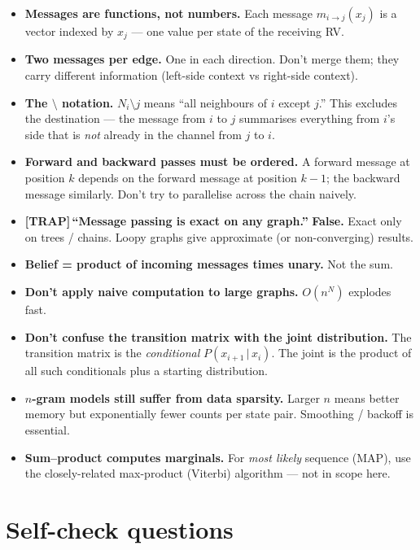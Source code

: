 \documentclass[11pt, a4paper]{article}
\newcommand{\trapflag}{\textcolor{trapBd}{\textbf{[TRAP]}}\,}
\begin{document}
\begin{itemize}
  \item \textbf{Messages are functions, not numbers.} Each message $m_{i\to j}(x_j)$ is a vector indexed by $x_j$ — one value per state of the receiving RV.
  \item \textbf{Two messages per edge.} One in each direction. Don't merge them; they carry different information (left-side context vs right-side context).
  \item \textbf{The $\setminus$ notation.} $N_i \setminus j$ means ``all neighbours of $i$ except $j$.'' This excludes the destination — the message from $i$ to $j$ summarises everything from $i$'s side that is \emph{not} already in the channel from $j$ to $i$.
  \item \textbf{Forward and backward passes must be ordered.} A forward message at position $k$ depends on the forward message at position $k-1$; the backward message similarly. Don't try to parallelise across the chain naively.
  \item \trapflag{}\textbf{``Message passing is exact on any graph.''} \textbf{False.} Exact only on trees / chains. Loopy graphs give approximate (or non-converging) results.
  \item \textbf{Belief = product of incoming messages times unary.} Not the sum.
  \item \textbf{Don't apply naive computation to large graphs.} $O(n^N)$ explodes fast.
  \item \textbf{Don't confuse the transition matrix with the joint distribution.} The transition matrix is the \emph{conditional} $P(x_{i+1}\,|\,x_i)$. The joint is the product of all such conditionals plus a starting distribution.
  \item \textbf{$n$-gram models still suffer from data sparsity.} Larger $n$ means better memory but exponentially fewer counts per state pair. Smoothing / backoff is essential.
  \item \textbf{Sum--product computes marginals.} For \emph{most likely} sequence (MAP), use the closely-related max-product (Viterbi) algorithm — not in scope here.
\end{itemize}

\section*{Self-check questions}
\end{document}

